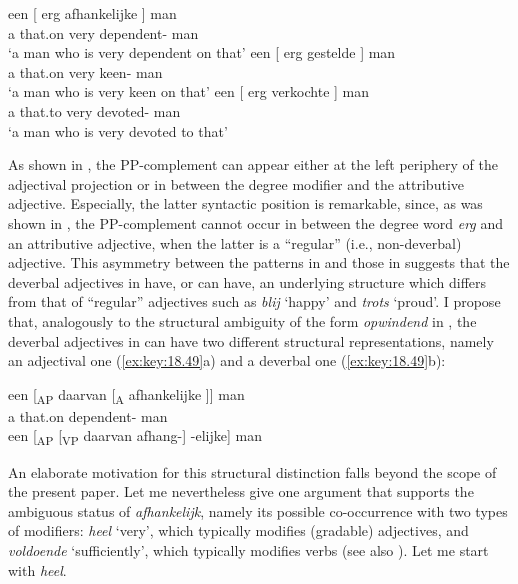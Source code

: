 \documentclass[output=paper]{langsci/langscibook}
\begin{document}
\ea%
    \label{ex:key:18.48}
	\ea
	\gll een [  erg  afhankelijke ] man\\
    a {} \phantom{〈}that.on very {} dependent-\Agr{} {} man\\
	\glt \enquote*{a man who is very dependent on that}
	\ex
	\gll een [  erg  gestelde ] man\\
    a {} \phantom{〈}that.on very {} keen-\Agr{} {} man\\
	\glt \enquote*{a man who is very keen on that}
	\ex
	\gll een [  erg  verkochte ] man\\
    a {} \phantom{〈}that.to very {} devoted-\Agr{} {} man\\
	\glt \enquote*{a man who is very devoted to that}
	\z
\z

As shown in , the PP-complement can appear either at the left
periphery of the adjectival projection or in between the degree modifier and
the attributive adjective. Especially, the latter syntactic position is
remarkable, since, as was shown in , the PP-complement cannot
occur in between the degree word \emph{erg} and an attributive adjective, when
the latter is a \enquote{regular} (i.e., non-deverbal) adjective. This
asymmetry between the patterns in  and those in 
suggests that the deverbal adjectives in  have, or can have, an
underlying structure which differs from that of \enquote{regular} adjectives
such as \emph{blij} \enquote*{happy} and \emph{trots} \enquote*{proud}. I
propose that, analogously to the structural ambiguity of the form
\emph{opwindend} in , the deverbal adjectives in 
can have two different structural representations, namely an adjectival one
(\ref{ex:key:18.49}a) and a deverbal one (\ref{ex:key:18.49}b):

\ea%
    \label{ex:key:18.49}
	\ea
	\gll een [\textsubscript{AP} daarvan [\textsubscript{A} afhankelijke ]] man\\
        a {} that.on {} dependent-\Agr{} {} man\\
	\ex een [\textsubscript{AP} [\textsubscript{VP} daarvan afhang-] -elijke] man
	\z
\z

An elaborate motivation for this structural distinction falls beyond the scope
of the present paper. Let me nevertheless give one argument that supports the
ambiguous status of \emph{afhankelijk}, namely its possible co-occurrence with
two types of modifiers: \emph{heel} \enquote*{very}, which typically modifies
(gradable) adjectives, and \emph{voldoende} \enquote*{sufficiently}, which
typically modifies verbs (see also \citealt{Broekhuis2013}). Let me start with
\emph{heel}.
\end{document}
